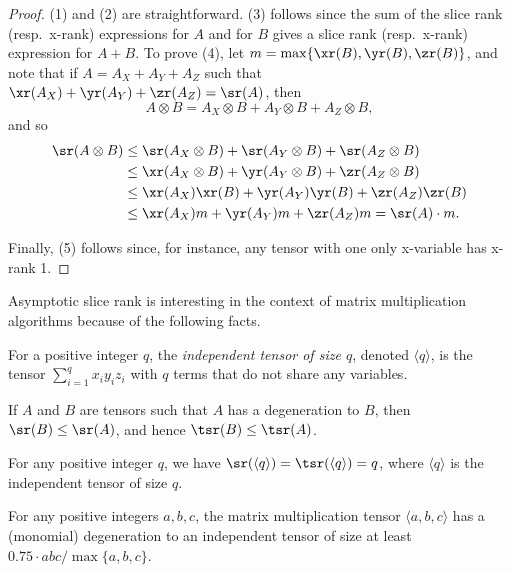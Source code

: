 \documentclass{toc}
\begin{document}
\begin{proof}
(1) and (2) are straightforward. (3) follows since the sum of the slice rank (resp.\ x-rank) expressions for $A$ and for $B$ gives a slice rank (resp.\ x-rank) expression for $A+B$. To prove (4), let $m = \max \{ \xr(B), \yr(B), \zr(B) \}$, and note that if $A = A_X + A_Y + A_Z$ such that $\xr(A_X) + \yr(A_Y) + \zr(A_Z) = \sr(A)$, then
$$A \otimes B = A_X\otimes B + A_Y\otimes B + A_Z\otimes B,$$
and so
\begin{align*}\sr(A \otimes B) &\leq \sr(A_X\otimes B) + \sr(A_Y\otimes B) + \sr(A_Z\otimes B) \\ &\leq \xr(A_X\otimes B) + \yr(A_Y\otimes B) + \zr(A_Z\otimes B)\\ &\leq \xr(A_X) \xr( B) + \yr(A_Y) \yr( B) + \zr(A_Z) \zr( B)\\ &\leq \xr(A_X) m + \yr(A_Y) m + \zr(A_Z) m = \sr(A) \cdot m.\end{align*}

Finally, (5) follows since, for instance, any tensor with one only x-variable has x-rank 1.
\end{proof}



Asymptotic slice rank is interesting in the context of matrix multiplication algorithms because of the following facts.

\begin{definition}
For a positive integer $q$, the \emph{independent tensor of size $q$}, denoted $\langle q \rangle$, is the tensor $\sum_{i=1}^q x_i y_i z_i$ with $q$ terms that do not share any variables.
\end{definition}

\begin{proposition} \label{propone}
If $A$ and $B$ are tensors such that $A$ has a degeneration to $B$, then $\sr(B) \leq \sr(A)$, and hence $\tsr(B) \leq \tsr(A)$.
\end{proposition}

\begin{proposition} \label{proptwo}
For any positive integer $q$, we have $\sr(\langle q \rangle) = \tsr(\langle q \rangle) = q$, where $\langle q \rangle$ is the independent tensor of size $q$.
\end{proposition}

\begin{proposition} \label{propthree}
For any positive integers $a,b,c$, the matrix multiplication tensor $\langle a,b,c \rangle$ has a (monomial) degeneration to an independent tensor of size at least $ 0.75 \cdot abc / \max \{a,b,c\}$.
\end{proposition}
\end{document}
